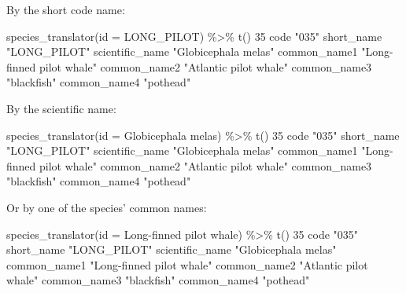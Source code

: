 \documentclass[
]{book}
\newenvironment{Shaded}{\begin{snugshade}}{\end{snugshade}}
\newcommand{\AttributeTok}[1]{\textcolor[rgb]{0.77,0.63,0.00}{#1}}
\newcommand{\DecValTok}[1]{\textcolor[rgb]{0.00,0.00,0.81}{#1}}
\newcommand{\FunctionTok}[1]{\textcolor[rgb]{0.00,0.00,0.00}{#1}}
\newcommand{\NormalTok}[1]{#1}
\newcommand{\SpecialCharTok}[1]{\textcolor[rgb]{0.00,0.00,0.00}{#1}}
\newcommand{\StringTok}[1]{\textcolor[rgb]{0.31,0.60,0.02}{#1}}
\begin{document}
By the short code name:

\begin{Shaded}
\begin{Highlighting}[]
\FunctionTok{species\_translator}\NormalTok{(}\AttributeTok{id =} \StringTok{\textquotesingle{}LONG\_PILOT\textquotesingle{}}\NormalTok{) }\SpecialCharTok{\%\textgreater{}\%} \FunctionTok{t}\NormalTok{()}
                \DecValTok{35}                       
\NormalTok{code            }\StringTok{"035"}                    
\NormalTok{short\_name      }\StringTok{"LONG\_PILOT"}             
\NormalTok{scientific\_name }\StringTok{"Globicephala melas"}     
\NormalTok{common\_name1    }\StringTok{"Long{-}finned pilot whale"}
\NormalTok{common\_name2    }\StringTok{"Atlantic pilot whale"}   
\NormalTok{common\_name3    }\StringTok{"blackfish"}              
\NormalTok{common\_name4    }\StringTok{"pothead"}                
\end{Highlighting}
\end{Shaded}

By the scientific name:

\begin{Shaded}
\begin{Highlighting}[]
\FunctionTok{species\_translator}\NormalTok{(}\AttributeTok{id =} \StringTok{\textquotesingle{}Globicephala melas\textquotesingle{}}\NormalTok{) }\SpecialCharTok{\%\textgreater{}\%} \FunctionTok{t}\NormalTok{()}
                \DecValTok{35}                       
\NormalTok{code            }\StringTok{"035"}                    
\NormalTok{short\_name      }\StringTok{"LONG\_PILOT"}             
\NormalTok{scientific\_name }\StringTok{"Globicephala melas"}     
\NormalTok{common\_name1    }\StringTok{"Long{-}finned pilot whale"}
\NormalTok{common\_name2    }\StringTok{"Atlantic pilot whale"}   
\NormalTok{common\_name3    }\StringTok{"blackfish"}              
\NormalTok{common\_name4    }\StringTok{"pothead"}                
\end{Highlighting}
\end{Shaded}

Or by one of the species' common names:

\begin{Shaded}
\begin{Highlighting}[]
\FunctionTok{species\_translator}\NormalTok{(}\AttributeTok{id =} \StringTok{\textquotesingle{}Long{-}finned pilot whale\textquotesingle{}}\NormalTok{) }\SpecialCharTok{\%\textgreater{}\%} \FunctionTok{t}\NormalTok{()}
                \DecValTok{35}                       
\NormalTok{code            }\StringTok{"035"}                    
\NormalTok{short\_name      }\StringTok{"LONG\_PILOT"}             
\NormalTok{scientific\_name }\StringTok{"Globicephala melas"}     
\NormalTok{common\_name1    }\StringTok{"Long{-}finned pilot whale"}
\NormalTok{common\_name2    }\StringTok{"Atlantic pilot whale"}   
\NormalTok{common\_name3    }\StringTok{"blackfish"}              
\NormalTok{common\_name4    }\StringTok{"pothead"}                
\end{Highlighting}
\end{Shaded}
\end{document}
